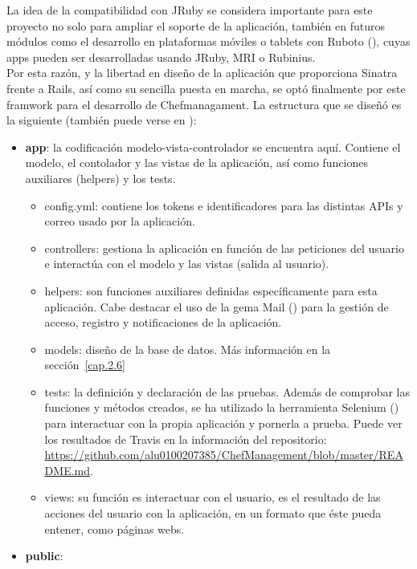 La idea de la compatibilidad con JRuby se considera importante para este proyecto no solo para ampliar el soporte de la aplicación, también en futuros módulos como el desarrollo en plataformas móviles o tablets con Ruboto (\cite{URL:Ruboto}), cuyas apps pueden ser desarrolladas usando JRuby, MRI o Rubinius. \\

Por esta razón, y la libertad en diseño de la aplicación que proporciona Sinatra frente a Rails, así como su sencilla puesta en marcha, se optó finalmente por este framwork para el desarrollo de Chefmanagament. La estructura que se diseñó es la siguiente (también puede verse en \cite{URL:GitHub}):

\begin{itemize}
	\item \textbf{app}: la codificación modelo-vista-controlador se encuentra aquí. Contiene el modelo, el contolador y las vistas de la aplicación, así como funciones auxiliares (helpers) y los tests.
		\begin{itemize}
			\item config.yml: contiene los tokens e identificadores para las distintas APIs y correo usado por la aplicación.
			\item controllers: gestiona la aplicación en función de las peticiones del usuario e interactúa con el modelo y las vistas (salida al usuario).
			\item helpers: son funciones auxiliares definidas específicamente para esta aplicación. Cabe destacar el uso de la gema Mail (\cite{URL:Gema_mail}) para la gestión de acceso, registro y notificaciones de la aplicación.
			\item models: diseño de la base de datos. Más información en la sección~\ref{cap.2.6}
			\item tests: la definición y declaración de las pruebas. Además de comprobar las funciones y métodos creados, se ha utilizado la herramienta Selenium (\cite{URL:Selenium}) para interactuar con la propia aplicación y pornerla a prueba. Puede ver los resultados de Travis en la información del repositorio: \href{https://github.com/alu0100207385/ChefManagement/blob/master/README.md}{https://github.com/alu0100207385/ChefManagement/blob/master/README.md}.
			\item views: su función es interactuar con el usuario, es el resultado de las acciones del usuario con la aplicación, en un formato que éste pueda entener, como páginas webs.
		\end{itemize}
	\item \textbf{public}:

\end{itemize}

